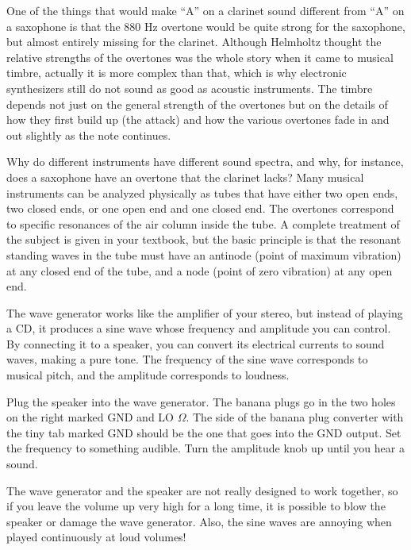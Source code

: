 One of the things that would make ``A'' on a clarinet sound
different from ``A'' on a saxophone is that the 880 Hz
overtone would be quite strong for the saxophone, but almost
entirely missing for the clarinet.  Although Helmholtz
thought the relative strengths of the overtones was the
whole story when it came to musical timbre, actually it is
more complex than that, which is why electronic synthesizers
still do not sound as good as acoustic instruments.  The
timbre depends not just on the general strength of the
overtones but on the details of how they first build up (the
attack) and how the various overtones fade in and out
slightly as the note continues.

Why do different instruments have different sound spectra,
and why, for instance, does a saxophone have an overtone
that the clarinet lacks?  Many musical instruments can be
analyzed physically as tubes that have either two open ends,
two closed ends, or one open end and one closed end.  The
overtones correspond to specific resonances of the air
column inside the tube.  A complete treatment of the subject
is given in your textbook, but the basic principle is that
the resonant standing waves in the tube must have an
antinode (point of maximum vibration) 
at any closed end of the tube, and a node (point of zero
vibration) at any open end.


The wave generator works like the amplifier of your stereo,
but instead of playing a CD, it produces a sine wave whose
frequency and amplitude you can control.  By connecting it
to a speaker, you can convert its electrical currents to
sound waves, making a pure tone.  The frequency of the sine
wave corresponds to musical pitch, and the amplitude
corresponds to loudness.

\setup

Plug the speaker into the wave generator.  The banana plugs
go in the two holes on the right marked GND and LO $\Omega$. The side of
the banana plug converter with the tiny tab marked GND should be the one that
goes into the GND output.  Set the frequency to
something audible.  Turn the amplitude knob up until you hear a sound.

The wave generator and the speaker are not really designed
to work together, so if you leave the volume up very high
for a long time, it is possible to blow the speaker or
damage the wave generator.  Also, the sine waves are
annoying when played continuously at loud volumes!

